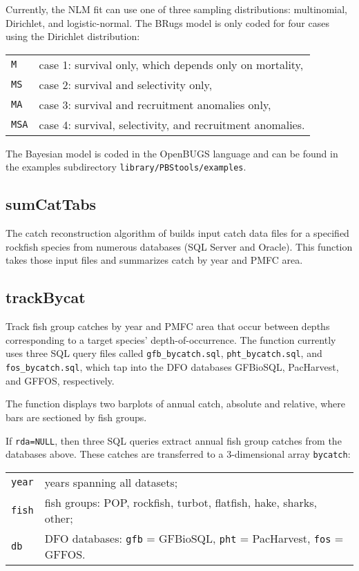 \documentclass[letterpaper,12pt,fleqn]{article}
\def\tab{\hspace{0.5 in}}
\newcommand{\code}[1]{\small\texttt{#1}\normalsize}
\newcommand{\db}[1]{\small\textmd{\textsf{#1}}\normalsize}
\begin{document}
\tab Currently, the NLM fit can use one of three sampling distributions: multinomial, Dirichlet, and logistic-normal. The BRugs model is only coded for four cases using the Dirichlet distribution:

\begin{tabular}{ll}
  \code{M}   & case 1: survival only, which depends only on mortality,\\
  \code{MS}  & case 2: survival and selectivity only,\\
  \code{MA}  & case 3: survival and recruitment anomalies only,\\
  \code{MSA} & case 4: survival, selectivity, and recruitment anomalies.\\
\end{tabular}

The Bayesian model is coded in the OpenBUGS language and can be found in the examples subdirectory 
\code{library/PBStools/examples}.

\subsection {sumCatTabs}

\tab The catch reconstruction algorithm of \citet{Haigh-Yamanaka:2011} builds input catch data files for a specified rockfish species from numerous databases (SQL Server and Oracle). This function takes those input files and summarizes catch by year and PMFC area. 

\subsection {trackBycat}

\tab Track fish group catches by year and PMFC area that occur between depths corresponding to a target species' depth-of-occurrence.
The function currently uses three SQL query files called \code{gfb\_bycatch.sql}, \code{pht\_bycatch.sql}, and \code{fos\_bycatch.sql}, which tap into the DFO databases \db{GFBioSQL}, \db{PacHarvest}, and \db{GFFOS}, respectively.
  
\tab The function displays two barplots of annual catch, absolute and relative, where bars are sectioned by fish groups.

\tab If \code{rda=NULL}, then three SQL queries extract annual fish group catches from the databases above. These catches are transferred to a 3-dimensional array \code{bycatch}:\\
\begin{tabular}{ll}
  \code{year} & years spanning all datasets; \\
  \code{fish} & fish groups: POP, rockfish, turbot, flatfish, hake, sharks, other; \\
  \code{db}   & DFO databases: \code{gfb} = \db{GFBioSQL}, \code{pht} = \db{PacHarvest}, \code{fos} = \db{GFFOS}.\\
\end{tabular}
\end{document}
